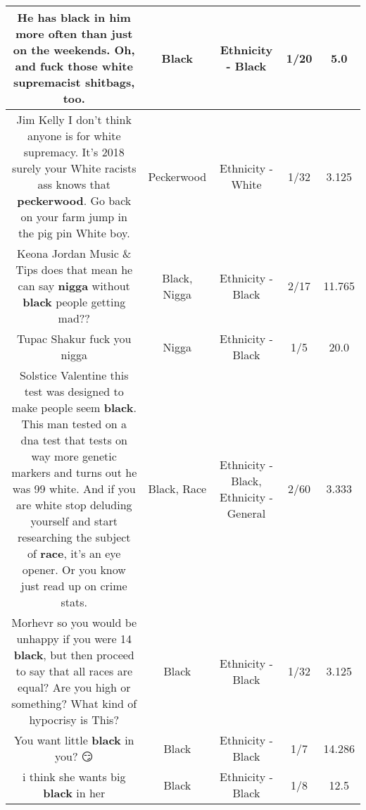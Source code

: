 \documentclass[11pt]{article}
\newlength\mylength
\begin{document}
\begin{center}
\begin{longtable}{|C{.65\mylength}|C{.30\mylength}|C{.12\mylength}|C{.12\mylength}|C{.12\mylength}|}
  \small He has \textbf{black} in him more often than just on the weekends.  Oh, and fuck those white supremacist shitbags, too.\normalsize   & Black & Ethnicity - Black & 1/20 & 5.0 \\  \hline
  \small Jim Kelly I don't think anyone is for white supremacy. It's 2018 surely your White racists ass knows that \textbf{peckerwood}. Go back on your farm jump in the pig pin White boy.\normalsize   & Peckerwood & Ethnicity - White & 1/32 & 3.125 \\  \hline
  \small Keona Jordan Music \& Tips does that mean he can say \textbf{nigga} without \textbf{black} people getting mad??\normalsize   & Black, Nigga & Ethnicity - Black & 2/17 & 11.765 \\  \hline
  \small Tupac Shakur fuck you nigga\normalsize   & Nigga & Ethnicity - Black & 1/5 & 20.0 \\  \hline
  \small Solstice Valentine this test was designed to make people seem \textbf{black}. This man tested on a dna test that tests on way more genetic markers and turns out he was 99 white. And if you are white stop deluding yourself and start researching the subject of \textbf{race}, it's an eye opener. Or you know just read up on crime stats.\normalsize   & Black, Race & Ethnicity - Black, Ethnicity - General & 2/60 & 3.333 \\  \hline
  \small Morhevr so you would be unhappy if you were 14 \textbf{black}, but then proceed to say that all races are equal? Are you high or something? What kind of hypocrisy is This?\normalsize   & Black & Ethnicity - Black & 1/32 & 3.125 \\  \hline
  \small You want little \textbf{black} in you? 😏\normalsize   & Black & Ethnicity - Black & 1/7 & 14.286 \\  \hline
  \small i think she wants big \textbf{black} in her\normalsize   & Black & Ethnicity - Black & 1/8 & 12.5 \\  \hline

\end{longtable}
\end{center}
\end{document}
